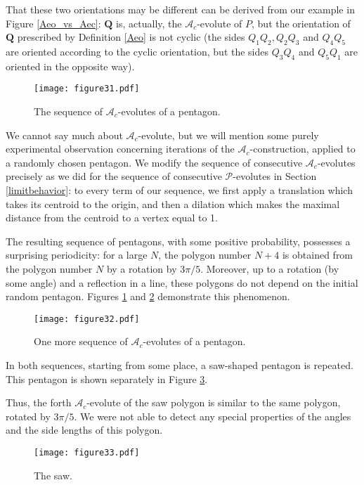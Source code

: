 \documentclass[12pt]{article}
\newcommand{\Pev}{\mathcal{P}}
\newcommand{\Aec}{\mathcal{A}_c}
\begin{document}
That these two orientations may be different can be derived from our example in Figure \ref{Aeo_vs_Aec}: $\mathbf Q$ is, actually, the $\Aec$-evolute of $P$, but the orientation of $\mathbf Q$ prescribed by Definition \ref{Aeo} is not cyclic (the sides $Q_1Q_2,Q_2Q_3$ and $Q_4Q_5$ are oriented according to the cyclic orientation, but the sides $Q_3Q_4$ and $Q_5Q_1$ are oriented in the opposite way).

\begin{figure}[hbtp]
	\centering
	\texttt{[image: figure31.pdf]} 
	\caption{The sequence of $\Aec$-evolutes of a pentagon.}
	\label{saw1}
\end{figure}

We cannot say much about $\Aec$-evolute, but we will mention some purely experimental observation concerning iterations of the $\Aec$-construction, applied to a randomly chosen pentagon. We modify the sequence of consecutive $\Aec$-evolutes precisely as we did for the sequence of consecutive $\Pev$-evolutes in Section \ref{limitbehavior}: to every term of our sequence, we first apply a translation which takes its centroid to the origin, and then a dilation which makes the maximal distance from the centroid to a vertex equal to 1. 


The resulting sequence of pentagons, with some positive probability, possesses a surprising periodicity:  for a large $N$, the polygon number $N+4$ is obtained from the polygon number $N$ by a  rotation by  $3\pi/5$. Moreover, up to a rotation (by some angle) and a reflection in a line, these polygons do not depend on the initial random pentagon. Figures \ref{saw1} and \ref{saw2} demonstrate this phenomenon. 

\begin{figure}[hbtp]
	\centering
	\texttt{[image: figure32.pdf]} 
	\caption{One more sequence of $\Aec$-evolutes of a pentagon.}
	\label{saw2}
\end{figure}

In both sequences, starting from some place, a saw-shaped pentagon is repeated. This pentagon is shown separately in Figure \ref{saw}.  

Thus, the forth $\Aec$-evolute of the saw polygon is similar to the same polygon, rotated by $3\pi/5$. We were not able to detect any special properties of the angles and the side lengths of this polygon.

\begin{figure}[hbtp]
	\centering
	\texttt{[image: figure33.pdf]} 
	\caption{The saw.}
	\label{saw}
\end{figure}
\end{document}
